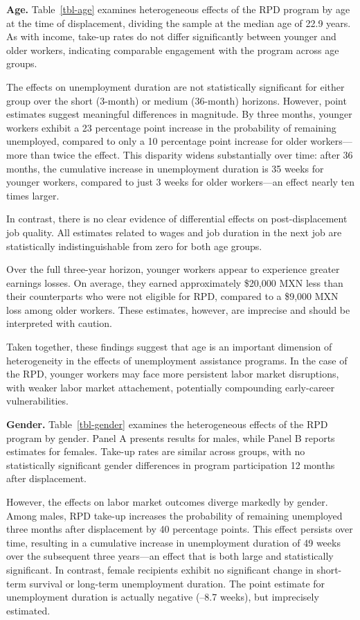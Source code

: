 \documentclass[
  4pt,
]{report}
\begin{document}
\textbf{Age.} Table~\ref{tbl-age} examines heterogeneous effects of the
RPD program by age at the time of displacement, dividing the sample at
the median age of 22.9 years. As with income, take-up rates do not
differ significantly between younger and older workers, indicating
comparable engagement with the program across age groups.

The effects on unemployment duration are not statistically significant
for either group over the short (3-month) or medium (36-month) horizons.
However, point estimates suggest meaningful differences in magnitude. By
three months, younger workers exhibit a 23 percentage point increase in
the probability of remaining unemployed, compared to only a 10
percentage point increase for older workers---more than twice the
effect. This disparity widens substantially over time: after 36 months,
the cumulative increase in unemployment duration is 35 weeks for younger
workers, compared to just 3 weeks for older workers---an effect nearly
ten times larger.

In contrast, there is no clear evidence of differential effects on
post-displacement job quality. All estimates related to wages and job
duration in the next job are statistically indistinguishable from zero
for both age groups.

Over the full three-year horizon, younger workers appear to experience
greater earnings losses. On average, they earned approximately \$20,000
MXN less than their counterparts who were not eligible for RPD, compared
to a \$9,000 MXN loss among older workers. These estimates, however, are
imprecise and should be interpreted with caution.

Taken together, these findings suggest that age is an important
dimension of heterogeneity in the effects of unemployment assistance
programs. In the case of the RPD, younger workers may face more
persistent labor market disruptions, with weaker labor market
attachement, potentially compounding early-career vulnerabilities.

\textbf{Gender.} Table~\ref{tbl-gender} examines the heterogeneous
effects of the RPD program by gender. Panel A presents results for
males, while Panel B reports estimates for females. Take-up rates are
similar across groups, with no statistically significant gender
differences in program participation 12 months after displacement.

However, the effects on labor market outcomes diverge markedly by
gender. Among males, RPD take-up increases the probability of remaining
unemployed three months after displacement by 40 percentage points. This
effect persists over time, resulting in a cumulative increase in
unemployment duration of 49 weeks over the subsequent three years---an
effect that is both large and statistically significant. In contrast,
female recipients exhibit no significant change in short-term survival
or long-term unemployment duration. The point estimate for unemployment
duration is actually negative (--8.7 weeks), but imprecisely estimated.
\end{document}
